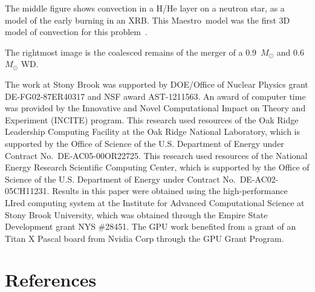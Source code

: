 \documentclass[letterpaper]{jpconf}
\newcommand{\maestro}{{\sffamily Maestro}}
\begin{document}
The middle figure shows convection in a H/He layer on a neutron star,
as a model of the early burning in an XRB.  This \maestro\ model was
the first 3D model of convection for this problem~\cite{xrb3}.

The rightmost image is the coalesced remains of the merger of a
0.9~$M_\odot$ and 0.6~$M_\odot$ WD.




\ack The work at Stony Brook was supported by DOE/Office of Nuclear
Physics grant DE-FG02-87ER40317 and NSF award AST-1211563.  An award
of computer time was provided by the Innovative and Novel
Computational Impact on Theory and Experiment (INCITE) program.  This
research used resources of the Oak Ridge Leadership Computing Facility
at the Oak Ridge National Laboratory, which is supported by the Office
of Science of the U.S. Department of Energy under Contract
No.\ DE-AC05-00OR22725.  This research used resources of the National
Energy Research Scientific Computing Center, which is supported by the
Office of Science of the U.S. Department of Energy under Contract
No.\ DE-AC02-05CH11231.  Results in this paper were obtained using the
high-performance LIred computing system at the Institute for Advanced
Computational Science at Stony Brook University, which was obtained
through the Empire State Development grant NYS \#28451.  The GPU work
benefited from a grant of an Titan X Pascal board from Nvidia Corp
through the GPU Grant Program.
                          

\section*{References}



\end{document}
